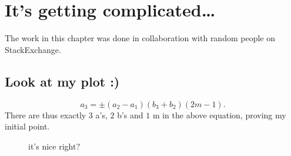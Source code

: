 

\Clear
\chapter{It's getting complicated\dots}
\label{cha:it_s_getting_complicated...}

The work in this chapter was done in collaboration with random people on StackExchange.

\section{Look at my plot :)}
\label{sec:look_at_my_plot_}

%
\begin{equation}
a_3 = \pm (a_2-a_1)(b_3+b_2)(2m-1).
\end{equation}
%
There are thus exactly $3$ a's, $2$ b's and $1$ m in the above equation, proving my initial point.

\begin{figure}[h]
	\centering
	\caption{it's nice right?}
	\label{fig:look_at_it}
\end{figure}

